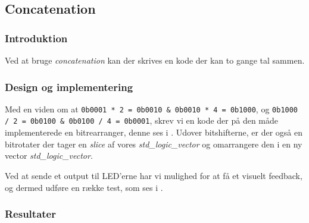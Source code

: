 

\subsection{Concatenation}

\subsubsection{Introduktion}
Ved at bruge \textit{concatenation} kan der skrives en kode der kan to gange tal sammen.
\subsubsection{Design og implementering}


Med en viden om at \texttt{0b0001 * 2 = 0b0010 \& 0b0010 * 4 = 0b1000}, og \texttt{0b1000 / 2 = 0b0100 \& 0b0100 / 4 = 0b0001}, skrev vi en kode der på den måde implementerede en bitrearranger, denne ses i . Udover bitshifterne, er der også en bitrotater der tager en \textit{slice} af vores \textit{std\_logic\_vector} og omarrangere den i en ny vector \textit{std\_logic\_vector}.



Ved at sende et output til LED'erne har vi mulighed for at få et visuelt feedback, og dermed udføre en række test, som ses i .






\subsubsection{Resultater}

